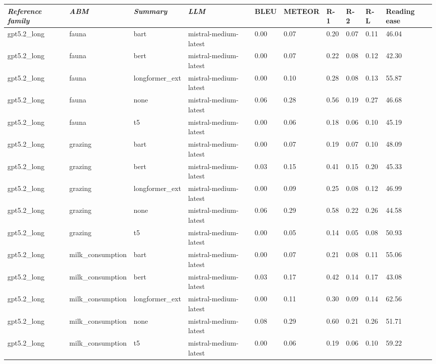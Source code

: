 \begin{tabular}{|l|l|l|l|l|l|l|l|l|l|}
\hline
\textit{\textbf{Reference family}} & \textit{\textbf{ABM}} & \textit{\textbf{Summary}} & \textit{\textbf{LLM}} & BLEU & METEOR & R-1 & R-2 & R-L & Reading ease \\
 \hline
 gpt5.2\_long & fauna & bart & mistral-medium-latest & 0.00 & 0.07 & 0.20 & 0.07 & 0.11 & 46.04 \\
 \hline
 gpt5.2\_long & fauna & bert & mistral-medium-latest & 0.00 & 0.07 & 0.22 & 0.08 & 0.12 & 42.30 \\
 \hline
 gpt5.2\_long & fauna & longformer\_ext & mistral-medium-latest & 0.00 & 0.10 & 0.28 & 0.08 & 0.13 & 55.87 \\
 \hline
 gpt5.2\_long & fauna & none & mistral-medium-latest & 0.06 & 0.28 & 0.56 & 0.19 & 0.27 & 46.68 \\
 \hline
 gpt5.2\_long & fauna & t5 & mistral-medium-latest & 0.00 & 0.06 & 0.18 & 0.06 & 0.10 & 45.19 \\
 \hline
 gpt5.2\_long & grazing & bart & mistral-medium-latest & 0.00 & 0.07 & 0.19 & 0.07 & 0.10 & 48.09 \\
 \hline
 gpt5.2\_long & grazing & bert & mistral-medium-latest & 0.03 & 0.15 & 0.41 & 0.15 & 0.20 & 45.33 \\
 \hline
 gpt5.2\_long & grazing & longformer\_ext & mistral-medium-latest & 0.00 & 0.09 & 0.25 & 0.08 & 0.12 & 46.99 \\
 \hline
 gpt5.2\_long & grazing & none & mistral-medium-latest & 0.06 & 0.29 & 0.58 & 0.22 & 0.26 & 44.58 \\
 \hline
 gpt5.2\_long & grazing & t5 & mistral-medium-latest & 0.00 & 0.05 & 0.14 & 0.05 & 0.08 & 50.93 \\
 \hline
 gpt5.2\_long & milk\_consumption & bart & mistral-medium-latest & 0.00 & 0.07 & 0.21 & 0.08 & 0.11 & 55.06 \\
 \hline
 gpt5.2\_long & milk\_consumption & bert & mistral-medium-latest & 0.03 & 0.17 & 0.42 & 0.14 & 0.17 & 43.08 \\
 \hline
 gpt5.2\_long & milk\_consumption & longformer\_ext & mistral-medium-latest & 0.00 & 0.11 & 0.30 & 0.09 & 0.14 & 62.56 \\
 \hline
 gpt5.2\_long & milk\_consumption & none & mistral-medium-latest & 0.08 & 0.29 & 0.60 & 0.21 & 0.26 & 51.71 \\
 \hline
 gpt5.2\_long & milk\_consumption & t5 & mistral-medium-latest & 0.00 & 0.06 & 0.19 & 0.06 & 0.10 & 59.22 \\
\hline
\end{tabular}
